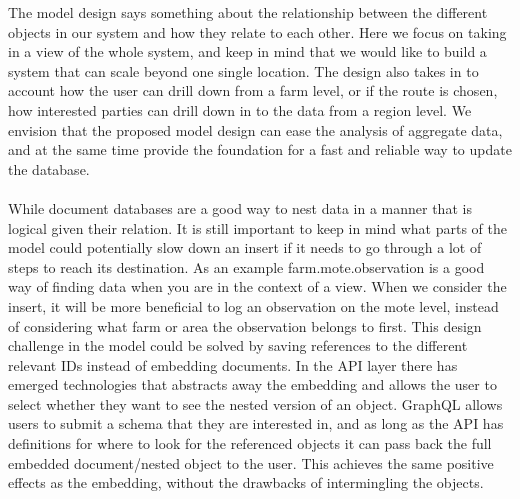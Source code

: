 \documentclass[]{uiophd}
\begin{document}
The model design says something about the relationship between the different objects in our system and how they relate to each other. Here we focus on taking in a view of the whole system, and keep in mind that we would like to build a system that can scale beyond one single location. The design also takes in to account how the user can drill down from a farm level, or if the route is chosen, how interested parties can drill down in to the data from a region level. We envision that the proposed model design can ease the analysis of aggregate data, and at the same time provide the foundation for a fast and reliable way to update the database.
\\\\
While document databases are a good way to nest data in a manner that is logical given their relation. It is still important to keep in  mind what parts of the model could potentially slow down an insert if it needs to go through a lot of steps to reach its destination. As an example farm.mote.observation is a good way of finding data when you are in the context of a view. When we consider the insert, it will be more beneficial to log an observation on the mote level, instead of considering what farm or area the observation belongs to first. This design challenge in the model could be solved by saving references to the different relevant IDs instead of embedding documents. In the API layer there has emerged technologies that abstracts away the embedding and allows the user to select whether they want to see the nested version of an object. GraphQL allows users to submit a schema that they are interested in, and as long as the API has definitions for where to look for the referenced objects it can pass back the full embedded document/nested object to the user. This achieves the same positive effects as the embedding, without the drawbacks of intermingling the objects.
\end{document}
